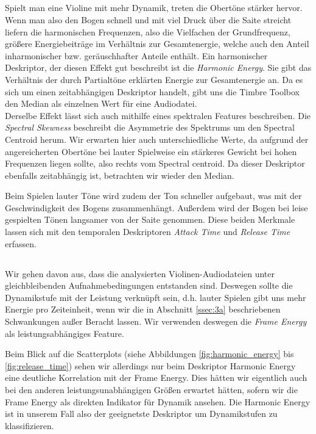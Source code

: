 \subsection{}
Spielt man eine Violine mit mehr Dynamik, treten die Obertöne stärker hervor.
Wenn man also den Bogen schnell und mit viel Druck über die Saite streicht liefern die harmonischen Frequenzen, also die Vielfachen der Grundfrequenz, größere Energiebeiträge im Verhältnis zur Gesamtenergie, welche auch den Anteil inharmonischer bzw. geräuschhafter Anteile enthält.  
Ein harmonischer Deskriptor, der diesen Effekt gut beschreibt ist die \textit{Harmonic Energy}.
Sie gibt das Verhältnis der durch Partialtöne erklärten Energie zur Gesamtenergie an.
Da es sich um einen zeitabhängigen Deskriptor handelt, gibt uns die Timbre Toolbox den Median als einzelnen Wert für eine Audiodatei.\\ 
Derselbe Effekt lässt sich auch mithilfe eines spektralen Features beschreiben.
Die \textit{Spectral Skewness} beschreibt die Asymmetrie des Spektrums um den Spectral Centroid herum.
Wir erwarten hier auch unterschiedliche Werte, da aufgrund der angereicherten Obertöne bei lauter Spielweise ein stärkeres Gewicht bei hohen Frequenzen liegen sollte, also rechts vom Spectral centroid.
Da dieser Deskriptor ebenfalls zeitabhängig ist, betrachten wir wieder den Median.

Beim Spielen lauter Töne wird zudem der Ton schneller aufgebaut, was mit der Geschwindigkeit des Bogens zusammenhängt.
Außerdem wird der Bogen bei leise gespielten Tönen langsamer von der Saite genommen.
Diese beiden Merkmale lassen sich mit den temporalen Deskriptoren \textit{Attack Time} und \textit{Release Time} erfassen.

\subsection{}
Wir gehen davon aus, dass die analysierten Violinen-Audiodateien unter gleichbleibenden Aufnahmebedingungen entstanden sind. 
Deswegen sollte die Dynamikstufe mit der Leistung verknüpft sein, d.h. lauter Spielen gibt uns mehr Energie pro Zeiteinheit, wenn wir die in Abschnitt \ref{ssec:3a} beschriebenen Schwankungen außer Beracht lassen.
Wir verwenden deswegen die \textit{Frame Energy} als leistungsabhängiges Feature.

Beim Blick auf die Scatterplots (siehe Abbildungen \ref{fig:harmonic_energy} bis \ref{fig:release_time}) sehen wir allerdings nur beim Deskriptor Harmonic Energy eine deutliche Korrelation mit der Frame Energy. 
Dies hätten wir eigentlich auch bei den anderen leistungsunabhängigen Größen erwartet hätten, sofern wir die Frame Energy als direkten Indikator für Dynamik ansehen.
Die Harmonic Energy ist in unserem Fall also der geeignetste Deskriptor um Dynamikstufen zu klassifizieren.

